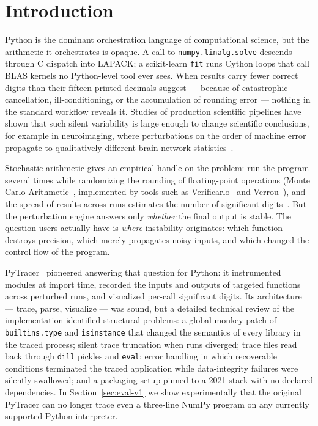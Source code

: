 \section{Introduction}
\label{sec:intro}

Python is the dominant orchestration language of computational science,
but the arithmetic it orchestrates is opaque. A call to
\texttt{numpy.linalg.solve} descends through C dispatch into LAPACK; a
scikit-learn \texttt{fit} runs Cython loops that call BLAS kernels no
Python-level tool ever sees. When results carry fewer correct digits than
their fifteen printed decimals suggest --- because of catastrophic
cancellation, ill-conditioning, or the accumulation of rounding error ---
nothing in the standard workflow reveals it. Studies of production
scientific pipelines have shown that such silent variability is large
enough to change scientific conclusions, for example in neuroimaging,
where perturbations on the order of machine error propagate to
qualitatively different brain-network statistics~\citep{kiar2021comparing}.

Stochastic arithmetic gives an empirical handle on the problem: run the
program several times while randomizing the rounding of floating-point
operations (Monte Carlo Arithmetic~\citep{parker1997monte}, implemented by
tools such as Verificarlo~\citep{denis2016verificarlo} and
Verrou~\citep{fevotte2017verrou}), and the spread of results across runs
estimates the number of significant digits~\citep{sohier2021confidence}.
But the perturbation engine answers only \emph{whether} the final output
is stable. The question users actually have is \emph{where} instability
originates: which function destroys precision, which merely propagates
noisy inputs, and which changed the control flow of the program.

PyTracer~\citep{chatelain2023pytracer} pioneered answering that question
for Python: it instrumented modules at import time, recorded the inputs
and outputs of targeted functions across perturbed runs, and visualized
per-call significant digits. Its architecture --- trace, parse, visualize
--- was sound, but a detailed technical review of the implementation
identified structural problems: a global monkey-patch of
\texttt{builtins.type} and \texttt{isinstance} that changed the semantics
of every library in the traced process; silent trace truncation when runs
diverged; trace files read back through \texttt{dill} pickles and
\texttt{eval}; error handling in which recoverable conditions terminated
the traced application while data-integrity failures were silently
swallowed; and a packaging setup pinned to a 2021 stack with no declared
dependencies. In Section~\ref{sec:eval-v1} we show experimentally that the
original PyTracer can no longer trace even a three-line NumPy program on
any currently supported Python interpreter.


